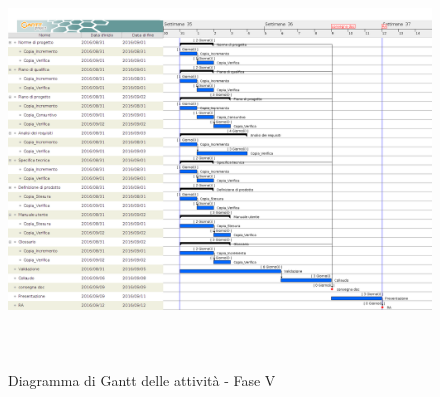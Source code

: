 		\begin{figure}[!h]
			\centering
			\includegraphics[height=11cm, width=15cm]{img/gantt/V} 
			\caption{Diagramma di Gantt delle attività - Fase V}
		\end{figure}
